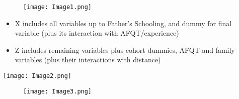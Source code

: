 \documentclass{beamer}
\begin{document}
\begin{frame}
  \begin{figure}
    \centering
    \texttt{[image: Image1.png]}

  \end{figure} \small \begin{itemize} \itemsep0em
  \item X includes all variables up to Father's Schooling, and dummy
    for final variable (plus its interaction with AFQT/experience)
\item Z includes remaining variables plus cohort dummies, AFQT and family
  variables (plus their interactions with distance)
  \end{itemize}
\end{frame}


\begin{frame}
  \texttt{[image: Image2.png]}
\end{frame}


\begin{frame}
  \begin{figure}
    \centering
      \texttt{[image: Image3.png]}
\end{figure}

\end{frame}
\end{document}
